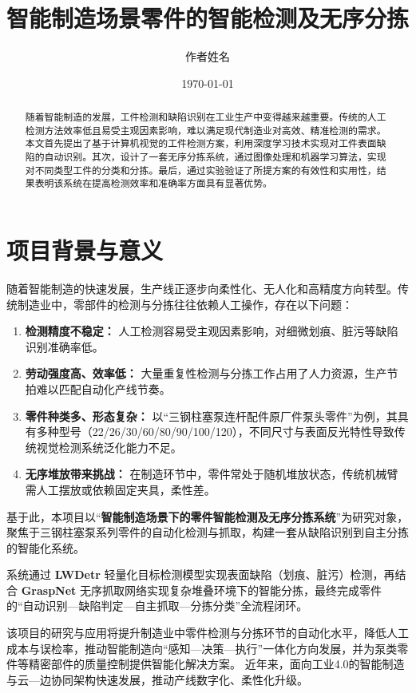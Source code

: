 \documentclass{cumcmthesis}
\title{智能制造场景零件的智能检测及无序分拣}
\author{作者姓名}
\date{\today}
\begin{document}
\newpage
\begin{abstract}
随着智能制造的发展，工件检测和缺陷识别在工业生产中变得越来越重要。传统的人工检测方法效率低且易受主观因素影响，难以满足现代制造业对高效、精准检测的需求。
本文首先提出了基于计算机视觉的工件检测方案，利用深度学习技术实现对工件表面缺陷的自动识别。其次，设计了一套无序分拣系统，通过图像处理和机器学习算法，实现对不同类型工件的分类和分拣。最后，通过实验验证了所提方案的有效性和实用性，结果表明该系统在提高检测效率和准确率方面具有显著优势。
\end{abstract}

\section{项目背景与意义}

随着智能制造的快速发展，生产线正逐步向柔性化、无人化和高精度方向转型。传统制造业中，零部件的检测与分拣往往依赖人工操作，存在以下问题：

\begin{enumerate}
    \item \textbf{检测精度不稳定：} 人工检测容易受主观因素影响，对细微划痕、脏污等缺陷识别准确率低。
    \item \textbf{劳动强度高、效率低：} 大量重复性检测与分拣工作占用了人力资源，生产节拍难以匹配自动化产线节奏。
    \item \textbf{零件种类多、形态复杂：} 以“三钢柱塞泵连杆配件原厂件泵头零件”为例，其具有多种型号（22/26/30/60/80/90/100/120），不同尺寸与表面反光特性导致传统视觉检测系统泛化能力不足。
    \item \textbf{无序堆放带来挑战：} 在制造环节中，零件常处于随机堆放状态，传统机械臂需人工摆放或依赖固定夹具，柔性差。
\end{enumerate}

基于此，本项目以“\textbf{智能制造场景下的零件智能检测及无序分拣系统}”为研究对象，聚焦于三钢柱塞泵系列零件的自动化检测与抓取，构建一套从缺陷识别到自主分拣的智能化系统。

系统通过 \textbf{LWDetr} \cite{carion2020end,zhu2020deformable} 轻量化目标检测模型实现表面缺陷（划痕、脏污）检测，再结合 \textbf{GraspNet} \cite{ten2017grasp,mahler2017dex}无序抓取网络实现复杂堆叠环境下的智能分拣，最终完成零件的“自动识别—缺陷判定—自主抓取—分拣分类”全流程闭环。

该项目的研究与应用将提升制造业中零件检测与分拣环节的自动化水平，降低人工成本与误检率，推动智能制造向“感知—决策—执行”一体化方向发展，并为泵类零件等精密部件的质量控制提供智能化解决方案。
近年来，面向工业4.0的智能制造与云—边协同架构快速发展，推动产线数字化、柔性化升级\cite{lasi2014industry,shi2016edge,davis2015smart}。
\end{document}
